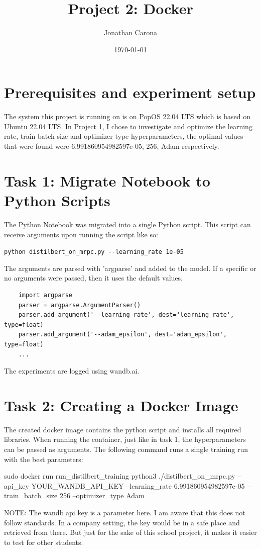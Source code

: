 \documentclass{article}
\title{Project 2: Docker}
\author{Jonathan Carona}
\date{\today}
\begin{document}
\section{Prerequisites and experiment setup}
The system this project is running on is on PopOS 22.04 LTS which is
based on Ubuntu 22.04 LTS. In Project 1, I chose to investigate and optimize the learning rate,
train batch size and optimizer type hyperparameters, the optimal values that were found were
6.991860954982597e-05, 256, Adam respectively.

\section{Task 1: Migrate Notebook to Python Scripts}
The Python Notebook was migrated into a single Python script. This script can receive arguments upon running the script like so:

\verb!python distilbert_on_mrpc.py --learning_rate 1e-05!

The arguments are parsed with 'argparse' and added to the model. If a specific or no arguments were passed, then it uses the default values.
\begin{lstlisting}
    import argparse
    parser = argparse.ArgumentParser()
    parser.add_argument('--learning_rate', dest='learning_rate', type=float)
    parser.add_argument('--adam_epsilon', dest='adam_epsilon', type=float)
    ...
    \end{lstlisting}

The experiments are logged using wandb.ai.

\section{Task 2: Creating a Docker Image}
The created docker image contains the python script and installs all required libraries.
When running the container, just like in task 1, the hyperparameters can be passed as arguments. 
The following command runs a single training run with the best parameters:

\begin{spverbatim}
    sudo docker run run_distilbert_training python3 ./distilbert_on_mrpc.py --api_key YOUR_WANDB_API_KEY --learning_rate 6.991860954982597e-05 --train_batch_size 256 --optimizer_type Adam    
    \end{spverbatim}

NOTE: The wandb api key is a parameter here. I am aware that this does not follow standards. In a company setting, the key would be in a safe place and retrieved from there. But just for the sake of this school project, it makes it easier to test for other students.
\end{document}
